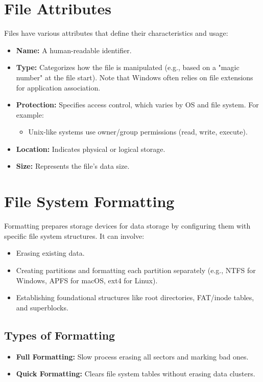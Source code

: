 \section{File Attributes}
Files have various attributes that define their characteristics and usage:
\begin{itemize}
    \item \textbf{Name:} A human-readable identifier.
    \item \textbf{Type:} Categorizes how the file is manipulated (e.g., based on a "magic number" at the file start). Note that Windows often relies on file extensions for application association.
    \item \textbf{Protection:} Specifies access control, which varies by OS and file system. For example:
        \begin{itemize}
            \item Unix-like systems use owner/group permissions (read, write, execute).
        \end{itemize}
    \item \textbf{Location:} Indicates physical or logical storage.
    \item \textbf{Size:} Represents the file's data size.
\end{itemize}

\section{File System Formatting}
Formatting prepares storage devices for data storage by configuring them with specific file system structures. It can involve:
\begin{itemize}
    \item Erasing existing data.
    \item Creating partitions and formatting each partition separately (e.g., NTFS for Windows, APFS for macOS, ext4 for Linux).
    \item Establishing foundational structures like root directories, FAT/inode tables, and superblocks.
\end{itemize}

\subsection{Types of Formatting}
\begin{itemize}
    \item \textbf{Full Formatting:} Slow process erasing all sectors and marking bad ones.
    \item \textbf{Quick Formatting:} Clears file system tables without erasing data clusters.
\end{itemize}

